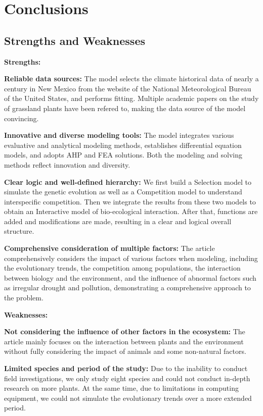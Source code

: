 \documentclass{mcmthesis}
\begin{document}
\section{Conclusions}

\subsection{Strengths and Weaknesses}
\textbf{Strengths:}
\indent

\textbf{Reliable data sources:} The model selects the climate historical data of nearly a century in New Mexico from the website of the National Meteorological Bureau of the United States, and performs fitting. Multiple academic papers on the study of grassland plants have been refered to, making the data source of the model convincing.

\textbf{Innovative and diverse modeling tools:} The model integrates various evaluative and analytical modeling methods, establishes differential equation models, and adopts AHP and FEA solutions. Both the modeling and solving methods reflect innovation and diversity.

\textbf{Clear logic and well-defined hierarchy:} We first build a Selection model to simulate the genetic evolution as well as a Competition model to understand interspecific competition. Then we integrate the results from these two models to obtain an Interactive model of bio-ecological interaction. After that, functions are added and modifications are made, resulting in a clear and logical overall structure.

\textbf{Comprehensive consideration of multiple factors:} The article comprehensively considers the impact of various factors when modeling, including the evolutionary trends, the competition among populations, the interaction between biology and the environment, and the influence of abnormal factors such as irregular drought and pollution, demonstrating a comprehensive approach to the problem.


\noindent
\textbf{Weaknesses:}

\textbf{Not considering the influence of other factors in the ecosystem:} The article mainly focuses on the interaction between plants and the environment without fully considering the impact of animals and some non-natural factors.

\textbf{Limited species and period of the study:} Due to the inability to conduct field investigations, we only study eight species and could not conduct in-depth research on more plants. At the same time, due to limitations in computing equipment, we could not simulate the evolutionary trends over a more extended period.
\end{document}
